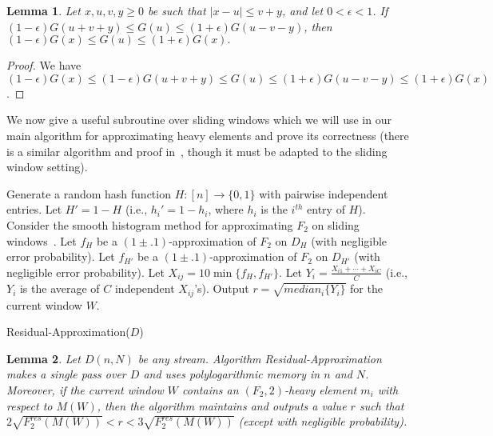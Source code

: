 \documentclass[11pt]{article}
\newtheorem{lem}{Lemma}
\begin{document}
\begin{lem}\label{lem:Gapprox2}
Let $x,u,v,y \geq 0$ be such that $|x - u| \leq v + y$, and let $0 < \epsilon < 1$.  If
$(1 - \epsilon)G(u+v+y) \leq G(u) \leq (1+\epsilon)G(u-v-y)$, then
$(1 - \epsilon)G(x) \leq G(u) \leq (1+\epsilon)G(x).$
\end{lem}

\begin{proof}
We have $(1-\epsilon)G(x) \leq (1-\epsilon)G(u+v+y) \leq G(u) \leq (1+\epsilon)G(u-v-y) \leq (1+\epsilon)G(x)$.
\end{proof}

We now give a useful subroutine over sliding windows which we will use in our main algorithm for
approximating heavy elements and prove its correctness
(there is a similar algorithm and proof in~\cite{BO10}, though it must be adapted to the sliding window setting).
\begin{algorithm}
\label{alg:res}
\DontPrintSemicolon
{} {
	 {
		Generate a random hash function $H : [n] \rightarrow \{0,1\}$ with pairwise independent entries.\;
		Let $H' = 1 - H$ (i.e., $h_i' = 1 - h_i$, where $h_i$ is the $i^{th}$ entry of $H$). \;
		Consider the smooth histogram method for approximating $F_2$ on sliding windows~\cite{BO07}. \;
		Let $f_H$ be a $(1 \pm .1)$-approximation of $F_2$ on $D_H$ (with negligible error probability). \;
		Let $f_{H'}$ be a $(1 \pm .1)$-approximation of $F_2$ on $D_{H'}$ (with negligible error probability). \;
		Let $X_{ij} = 10\min\{f_H,f_{H'}\}$.
	}
	Let $Y_i = \frac{X_{i1} + \cdots + X_{iC}}{C}$ (i.e., $Y_i$ is the average of $C$ independent $X_{ij}$'s).\;
}
Output $r = \sqrt{median_i \{ Y_i \}}$ for the current window $W$. \;
\caption{Residual-Approximation($D$)}
\end{algorithm}
\begin{lem}\label{lem:resapprox}
Let $D(n,N)$ be any stream.  Algorithm Residual-Approximation makes a single pass over $D$ and uses
polylogarithmic memory in $n$ and $N$.  Moreover, if the current window $W$ contains an
$(F_2,2)$-heavy element $m_i$ with respect to $M(W)$, then the algorithm maintains and outputs
a value $r$ such that $2\sqrt{F_2^{res}(M(W))} < r < 3\sqrt{F_2^{res}(M(W))}$ (except
with negligible probability).
\end{lem}
\end{document}

